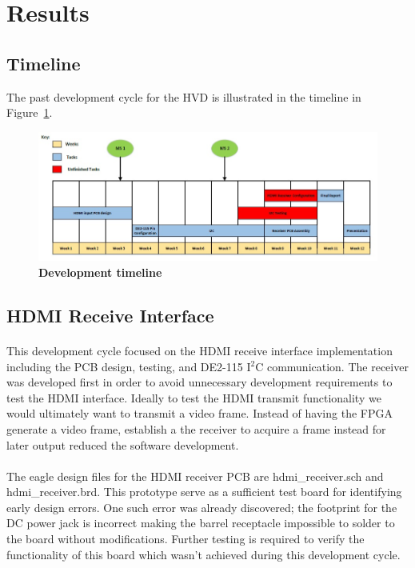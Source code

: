 \documentclass[pdftex,12pt,a4paper]{article}
\begin{document}
\section{Results}

\subsection{Timeline}

The past development cycle for the HVD is illustrated in the timeline in Figure~\ref{fig:time}.

\begin{figure}[H]
\centering
\includegraphics[width=\textwidth]{timeline_fall.jpg}
\caption{\textbf{Development timeline}}
\label{fig:time}
\end{figure}

\subsection{HDMI Receive Interface}

\paragraph{}
This development cycle focused on the HDMI receive interface implementation including the PCB design, testing, and DE2-115 I$^2$C communication. The receiver was developed first in order to avoid unnecessary development requirements to test the HDMI interface. Ideally to test the HDMI transmit functionality we would ultimately want to transmit a video frame. Instead of having the FPGA generate a video frame, establish a the receiver to acquire a frame instead for later output reduced the software development.

\paragraph{}
The eagle design files for the HDMI receiver PCB are hdmi\_receiver.sch and hdmi\_receiver.brd. This prototype serve as a sufficient test board for identifying early design errors. One such error was already discovered; the footprint for the DC power jack is incorrect making the barrel receptacle impossible to solder to the board without modifications. Further testing is required to verify the functionality of this board which wasn't achieved during this development cycle.
\end{document}
